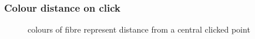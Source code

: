 \documentclass[12pt]{article} %
\begin{document}
\begin{flushleft}
\subsubsection{Colour distance on click} %
\begin{figure}[H] %
\caption{colours of fibre represent distance from a central clicked point}
\label{fig:speciation}
\end{figure}


\end{flushleft}
\end{document}

